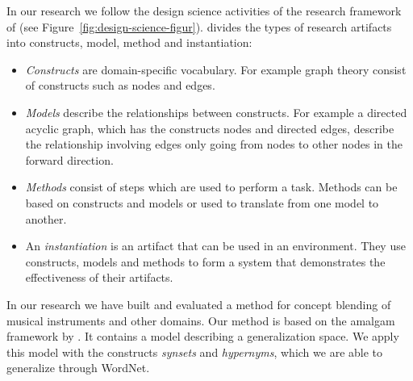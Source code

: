 In our research we follow the design science activities of the research framework of \citet{march1995design} (see Figure~\ref{fig:design-science-figur}).
\citet{march1995design} divides the types of research artifacts into constructs, model, method and instantiation:
\begin{itemize}
\item \emph{Constructs} are domain-specific vocabulary. For example graph theory consist of constructs such as nodes and edges.
\item \emph{Models} describe the relationships between constructs. For example a directed acyclic graph, which has the constructs nodes and directed edges, describe the relationship involving edges only going from nodes to other nodes in the forward direction.
\item \emph{Methods} consist of steps which are used to perform a task. Methods can be based on constructs and models or used to translate from one model to another.
\item An \emph{instantiation} is an artifact that can be used in an environment. They use constructs, models and methods to form a system that demonstrates the effectiveness of their artifacts.
\end{itemize}

In our research we have built and evaluated a method for concept blending of musical instruments and other domains. Our method is based on the amalgam framework by \citet{ontanon2010amalgams}. It contains a model describing a generalization space. We apply this model with the constructs \emph{synsets} and \emph{hypernyms}, which we are able to generalize through WordNet. %



